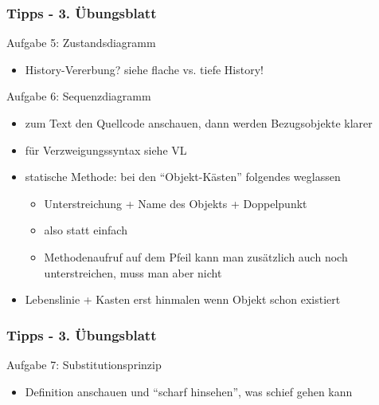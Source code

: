 \documentclass[18pt]{beamer}
\begin{document}
	\begin{frame}
		\frametitle{Tipps - 3. Übungsblatt}
			\begin{exampleblock}{Aufgabe 5: Zustandsdiagramm}
				\begin{itemize}
					\pause
					\item History-Vererbung? siehe flache vs. tiefe History!
				\end{itemize}
			\end{exampleblock}
			\pause
			\begin{exampleblock}{Aufgabe 6: Sequenzdiagramm}
				\begin{itemize}
					\item zum Text den Quellcode anschauen, dann werden Bezugsobjekte klarer
					\pause
					\item für Verzweigungssyntax siehe VL
					\pause
					\item statische Methode: bei den \enquote{Objekt-Kästen} folgendes weglassen
					\begin{itemize}
						\item Unterstreichung + Name des Objekts + Doppelpunkt
						\item also statt  einfach 
						\item Methodenaufruf auf dem Pfeil kann man zusätzlich auch noch unterstreichen, muss man aber nicht
					\end{itemize}  
					\pause
					\item Lebenslinie + Kasten erst hinmalen wenn Objekt schon existiert
				\end{itemize}
			\end{exampleblock}
	\end{frame}

	\begin{frame}
\frametitle{Tipps - 3. Übungsblatt}
\begin{exampleblock}{Aufgabe 7: Substitutionsprinzip}
	\begin{itemize}
		\item Definition anschauen und \enquote{scharf hinsehen}, was schief gehen kann
	\end{itemize}
\end{exampleblock}
\end{frame}
\end{document}
